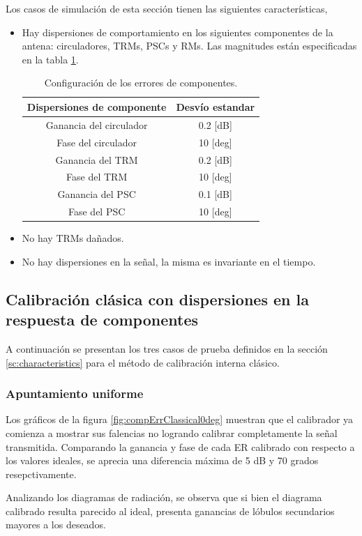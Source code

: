 Los casos de simulación de esta sección tienen las siguientes características,
\begin{itemize}
	\item Hay dispersiones de comportamiento en los siguientes componentes de la antena: circuladores, TRMs, PSCs y RMs. Las 
		magnitudes están especificadas en la tabla \ref{tab:errorReferences}.
		\begin{table}[H]
		  \footnotesize
		  \centering
		  \begin{tabular}{|c|c|}
			\hline
			\textbf{Dispersiones de componente} & \textbf{Desvío estandar} \tabularnewline \hline 
			Ganancia del circulador &  0.2 [dB] \tabularnewline\hline 
			Fase del circulador &  10 [deg] \tabularnewline\hline 
			Ganancia del TRM &  0.2 [dB] \tabularnewline\hline 
			Fase del TRM &  10 [deg] \tabularnewline\hline 
			Ganancia del PSC &  0.1 [dB] \tabularnewline\hline 
			Fase del PSC &  10 [deg] \tabularnewline\hline 
		  \end{tabular}
		  \caption{Configuración de los errores de componentes.}
		  \label{tab:errorReferences}
		\end{table}
	\item No hay TRMs dañados.
	\item No hay dispersiones en la señal, la misma es invariante en el tiempo.
\end{itemize}

\subsection{Calibración clásica con dispersiones en la respuesta de componentes}
\label{ssc:classicalDispersion}

A continuación se presentan los tres casos de prueba definidos en la sección \ref{sc:characteristics} para el método de
calibración interna clásico.


\subsubsection{Apuntamiento uniforme}

Los gráficos de la figura \ref{fig:compErrClassical0deg} muestran que el calibrador ya comienza a mostrar sus falencias no 
logrando calibrar completamente la señal transmitida. Comparando la ganancia y fase de cada ER calibrado con respecto a los
valores ideales, se aprecia una diferencia máxima de 5 dB y 70 grados resepctivamente.

Analizando los diagramas de radiación, se observa que si bien el diagrama calibrado resulta parecido al ideal, presenta ganancias
de lóbulos secundarios mayores a los deseados.


